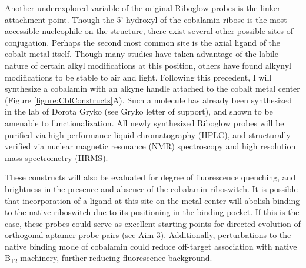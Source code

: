 Another underexplored variable of the original Riboglow probes is the linker attachment point.
Though the 5' hydroxyl of the cobalamin ribose is the most accessible nucleophile on the structure, there exist several other possible sites of conjugation.
Perhaps the second most common site is the axial ligand of the cobalt metal itself.
Though many studies have taken advantage of the labile nature of certain alkyl modifications at this position\cite{ShellVitaminB12Tunable2015}, others have found alkynyl modifications to be stable to air and light\cite{ChrominskiReductionfreesynthesisstable2013,RuetzMarkusPhenylethynylcobalaminLightStable2013}.
Following this precedent, I will synthesize a cobalamin with an alkyne handle attached to the cobalt metal center (Figure \ref{figure:CblConstructs}A).
Such a molecule has already been synthesized in the lab of Dorota Gryko (see Gryko letter of support), and shown to be amenable to functionalization\cite{ChrominskiVitaminB12Derivatives2014}. All newly synthesized Riboglow probes will be purified via high-performance liquid chromatography (HPLC), and structurally verified via nuclear magnetic resonance (NMR) spectroscopy and high resolution mass spectrometry (HRMS).

These constructs will also be evaluated for degree of fluorescence quenching, and brightness in the presence and absence of the cobalamin riboswitch.
It is possible that incorporation of a ligand at this site on the metal center will abolish binding to the native riboswitch due to its positioning in the binding pocket\cite{JohnsonJrB12cofactorsdirectly2012}.
If this is the case, these probes could serve as excellent starting points for directed evolution of orthogonal aptamer-probe pairs (see Aim 3).
Additionally, perturbations to the native binding mode of cobalamin could reduce off-target association with native B\textsubscript{12} machinery\cite{PathareSynthesisCobalaminBiotin1996}, further reducing fluorescence background.

